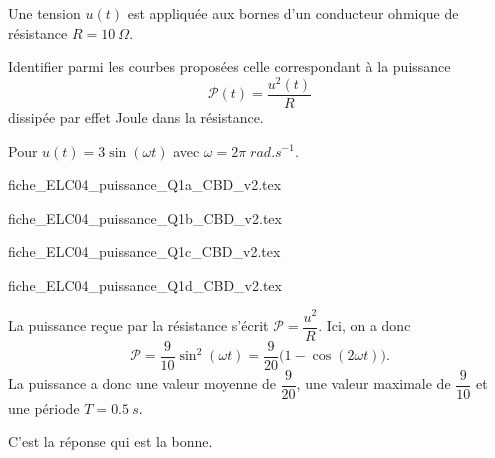 \hauteurLargeurCadreReponse		{8mm}{4cm}
\typeEntrainement				{} %
\initialisationEntrainement

\def\globalScaleGraphes{0.7}

\debutEntrainement

Une tension  $u(t)$  est appliquée aux bornes d'un conducteur ohmique de résistance $R=\SI{10}{\Omega}$. 

Identifier parmi les courbes proposées celle correspondant à la puissance 
\[
\mathcal{P}(t)=\dfrac{u^2(t)}{R}
\]
 dissipée par effet Joule dans la résistance.

\begin{enonce}
Pour $u(t)=3\sin(\omega t)$ avec $\omega = 2\pi\; \si{rad.s^{-1}}$.

\begin{listeQCM2Colonnes}
\item {fiche_ELC04_puissance_Q1a_CBD_v2.tex}
\item {fiche_ELC04_puissance_Q1b_CBD_v2.tex}
\item {fiche_ELC04_puissance_Q1c_CBD_v2.tex}
\item {fiche_ELC04_puissance_Q1d_CBD_v2.tex}
\end{listeQCM2Colonnes}
\medskip
\end{enonce}

\reponse{\reponseA{}} 

\begin{corrige}
La puissance reçue par la résistance s'écrit $\mathcal{P}=\dfrac{u^2}{R}$. Ici, on a donc
\[
\mathcal{P}=\dfrac{9}{10}\sin^2 \left( \omega t\right)=\dfrac{9}{20}\big ( 1-\cos \left( 2 \omega t\right)\big ).
\] 
La puissance a donc une valeur moyenne de $\dfrac{9}{20}$, une valeur maximale de $\dfrac{9}{10}$ et une période $T=\SI{0.5}{s}$.

C'est la réponse \reponseA{} qui est la bonne.
\end{corrige}



